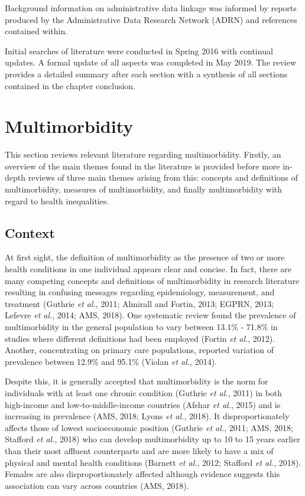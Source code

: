 \documentclass[12pt,a4paper,oneside,table]{report}
\begin{document}
Background information on administrative data linkage was informed by
reports produced by the Administrative Data Research Network (ADRN) and
references contained within.

Initial searches of literature were conducted in Spring 2016 with
continual updates. A formal update of all aspects was completed in May
2019. The review provides a detailed summary after each section with a
synthesis of all sections contained in the chapter conclusion.

\newpage
\section{Multimorbidity}\label{sec:mm}

This section reviews relevant literature regarding multimorbidity.
Firstly, an overview of the main themes found in the literature is
provided before more in-depth reviews of three main themes arising from
this: concepts and definitions of multimorbidity, measures of
multimorbidity, and finally multimorbidity with regard to health
inequalities.

\subsection{Context}\label{subsec:litrv-mm-context}

At first sight, the definition of multimorbidity as the presence of two
or more health conditions in one individual appears clear and concise.
In fact, there are many competing concepts and definitions of
multimorbidity in research literature resulting in confusing messages
regarding epidemiology, measurement, and treatment (Guthrie \emph{et
al.}, 2011; Almirall and Fortin, 2013; EGPRN, 2013; Lefevre \emph{et
al.}, 2014; AMS, 2018). One systematic review found the prevalence of
multimorbidity in the general population to vary between 13.1\% - 71.8\%
in studies where different definitions had been employed (Fortin
\emph{et al.}, 2012). Another, concentrating on primary care
populations, reported variation of prevalence between 12.9\% and 95.1\%
(Violan \emph{et al.}, 2014).

Despite this, it is generally accepted that multimorbidity is the norm
for individuals with at least one chronic condition (Guthrie \emph{et
al.}, 2011) in both high-income and low-to-middle-income countries
(Afshar \emph{et al.}, 2015) and is increasing in prevalence (AMS, 2018;
Lyons \emph{et al.}, 2018). It disproportionately affects those of
lowest socioeconomic position (Guthrie \emph{et al.}, 2011; AMS, 2018;
Stafford \emph{et al.}, 2018) who can develop multimorbidity up to 10 to
15 years earlier than their most affluent counterparts and are more
likely to have a mix of physical and mental health conditions (Barnett
\emph{et al.}, 2012; Stafford \emph{et al.}, 2018). Females are also
disproportionately affected although evidence suggests this association
can vary across countries (AMS, 2018).
\end{document}
